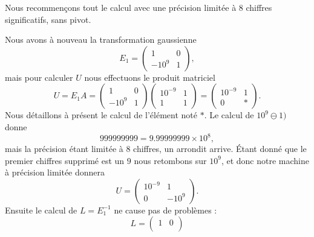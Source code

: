 \begin{example}     \label{EXooNVRNooJgQmQc}
    Nous recommençons tout le calcul avec une précision limitée à \( 8\) chiffres significatifs, sans pivot.

    Nous avons à nouveau la transformation gaussienne
    \begin{equation}
        E_1=\begin{pmatrix}
            1    &   0    \\ 
            -10^9    &   1    
        \end{pmatrix},
    \end{equation}
    mais pour calculer \( U\) nous effectuons le produit matriciel
    \begin{equation}
        U=E_1A=\begin{pmatrix}
            1    &   0    \\ 
            -10^9    &   1    
        \end{pmatrix}\begin{pmatrix}
            10^{-9}   &   1    \\ 
            1    &   1    
        \end{pmatrix}=\begin{pmatrix}
            10^{-9}    &   1    \\ 
            0    &   *    
        \end{pmatrix}.
    \end{equation}
    Nous détaillons à présent le calcul de l'élément noté \( *\). Le calcul de \( 10^9\ominus 1)\) donne
    \begin{equation}
        999999999=9.99999999\times 10^{8},
    \end{equation}
    mais la précision étant limitée à \( 8\) chiffres, un arrondit arrive. Étant donné que le premier chiffres supprimé est un \( 9\) nous retombons sur \( 10^9\), et donc notre machine à précision limitée donnera
    \begin{equation}
        U=\begin{pmatrix}
            10^{-9}    &   1    \\ 
            0    &   -10^{9}    
        \end{pmatrix}.
    \end{equation}
    Ensuite le calcul de \( L=E_1^{-1}\) ne cause pas de problèmes :
    \begin{equation}
        L=\begin{pmatrix}
            1    &   0    \\ 

\end{pmatrix}
\end{equation}
\end{example}
